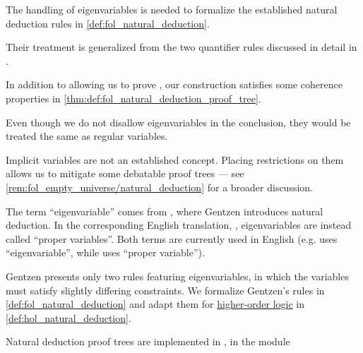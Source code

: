 \begin{comments}
  \item The handling of eigenvariables is needed to formalize the established natural deduction rules in \cref{def:fol_natural_deduction}.

  Their treatment is generalized from the two quantifier rules discussed in detail in \cite[\S 2.1]{TroelstraSchwichtenberg2000BasicProofTheory}.

  In addition to allowing us to prove , our construction satisfies some coherence properties in \cref{thm:def:fol_natural_deduction_proof_tree}.

  \item Even though we do not disallow eigenvariables in the conclusion, they would be treated the same as regular variables.

  \item Implicit variables are not an established concept. Placing restrictions on them allows us to mitigate some debatable proof trees --- see \cref{rem:fol_empty_universe/natural_deduction} for a broader discussion.

  \item The term \enquote{eigenvariable} comes from \cite{Gentzen1935LogischeSchließen}, where Gentzen introduces natural deduction. In the corresponding English translation, \cite[293]{Gentzen1964LogicalDeduction}, eigenvariables are instead called \enquote{proper variables}. Both terms are currently used in English (e.g. \Textcite[\S 5.1.10]{Mimram2020ProgramEqualsProof} uses \enquote{eigenvariable}, while \textcite[38]{TroelstraSchwichtenberg2000BasicProofTheory} uses \enquote{proper variable}).

  Gentzen presents only two rules featuring eigenvariables, in which the variables must satisfy slightly differing constraints. We formalize Gentzen's rules in \cref{def:fol_natural_deduction} and adapt them for \hyperref[def:higher_order_logic]{higher-order logic} in \cref{def:hol_natural_deduction}.

  \item Natural deduction proof trees are implemented in \cite{notebook:code}, in the module
  \begin{CodeRefDisplay}
  \end{CodeRefDisplay}
\end{comments}

